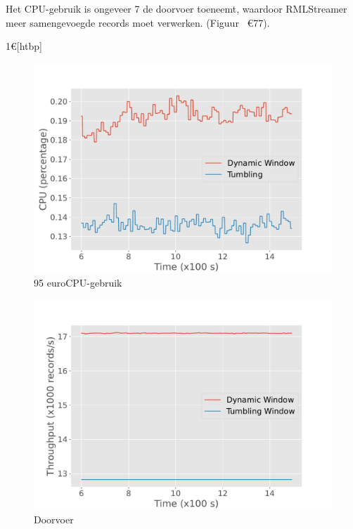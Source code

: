 Het CPU-gebruik is ongeveer 7%
de doorvoer toeneemt, waardoor RMLStreamer meer samengevoegde records moet verwerken.
(Figuur ~€77). 

1€[htbp]
    \begin{subfigure}[b]{0.5\columnwidth}
        \includegraphics[width=\columnwidth]{fig/constant-rate/cpu_comparison.pdf}
        95 euro{CPU-gebruik}
        \label{fig:constant_cpu}
    \end{subfigure}
    \begin{subfigure}[b]{0.5\columnwidth}
        \includegraphics[width=\columnwidth]{fig/constant-rate/throughput_comparison.pdf}
        \caption{Doorvoer}
        \label{fig:constant_thorughput}
    \end{subfigure}
